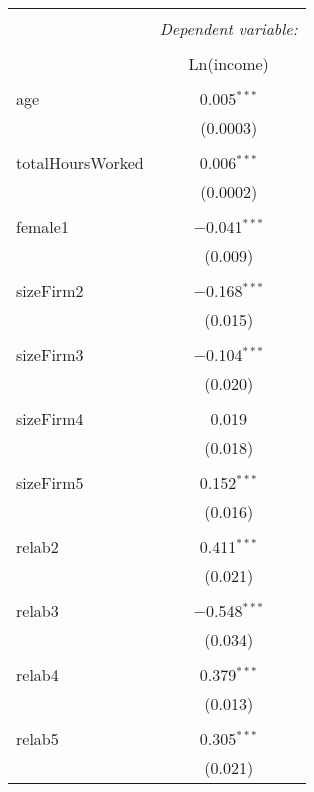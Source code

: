 
\begin{table}[!htbp] \centering 
  \caption{} 
  \label{} 
\begin{tabular}{@{\extracolsep{5pt}}lc} 
\\[-1.8ex]\hline 
\hline \\[-1.8ex] 
 & \multicolumn{1}{c}{\textit{Dependent variable:}} \\ 
\cline{2-2} 
\\[-1.8ex] & Ln(income) \\ 
\hline \\[-1.8ex] 
 age & 0.005$^{***}$ \\ 
  & (0.0003) \\ 
  & \\ 
 totalHoursWorked & 0.006$^{***}$ \\ 
  & (0.0002) \\ 
  & \\ 
 female1 & $-$0.041$^{***}$ \\ 
  & (0.009) \\ 
  & \\ 
 sizeFirm2 & $-$0.168$^{***}$ \\ 
  & (0.015) \\ 
  & \\ 
 sizeFirm3 & $-$0.104$^{***}$ \\ 
  & (0.020) \\ 
  & \\ 
 sizeFirm4 & 0.019 \\ 
  & (0.018) \\ 
  & \\ 
 sizeFirm5 & 0.152$^{***}$ \\ 
  & (0.016) \\ 
  & \\ 
 relab2 & 0.411$^{***}$ \\ 
  & (0.021) \\ 
  & \\ 
 relab3 & $-$0.548$^{***}$ \\ 
  & (0.034) \\ 
  & \\ 
 relab4 & 0.379$^{***}$ \\ 
  & (0.013) \\ 
  & \\ 
 relab5 & 0.305$^{***}$ \\ 
  & (0.021) \\ 

\end{tabular}
\end{table}
